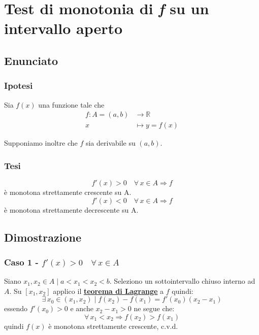 \documentclass[../dimostrazioni]{subfiles}
\begin{document}
    \chapter{Test di monotonia di \textit{f} su un intervallo aperto}

        \section*{Enunciato}

        \subsection*{Ipotesi}

            Sia \(f(x)\) una funzione tale che
            \begin{align*}
                f : A = (a, b) &\longrightarrow \mathbb{R}\\
                x &\longmapsto y = f(x) 
            \end{align*}

            Supponiamo inoltre che \(f\) sia derivabile su \((a, b)\).

        \subsection*{Tesi}

            \[ f'(x) > 0 \quad \forall \, x \in A \Rightarrow f \] è monotona strettamente crescente su A. 
            \[ f'(x) < 0 \quad \forall \, x \in A \Rightarrow f \] è monotona strettamente decrescente su A.

        \section*{Dimostrazione}

            \medskip

            \subsection*{Caso 1 - \( f'(x) > 0 \quad \forall \, x \in A \)}

            Siano \(x_1, x_2 \in A \mid a < x_1 < x_2 < b \). Seleziono un sottointervallo chiuso interno ad \(A\).
            Su \( [x_1, x_2] \) applico il \textbf{\hyperref[teoLagrange]{teorema di Lagrange}} a \(f\) quindi:
            \[
                \exists \, x_0 \in (x_1, x_2) \mid f(x_2) - f(x_1) = f'(x_0)(x_2 - x_1) 
            \]
            essendo \( f'(x_0) > 0 \) e anche \( x_2 - x_1 > 0 \) ne segue che:
            \[
                \forall \, x_1 < x_2 \Rightarrow f(x_2) > f(x_1)
            \]
            quindi \(f(x)\) è monotona strettamente crescente, c.v.d.
\end{document}
